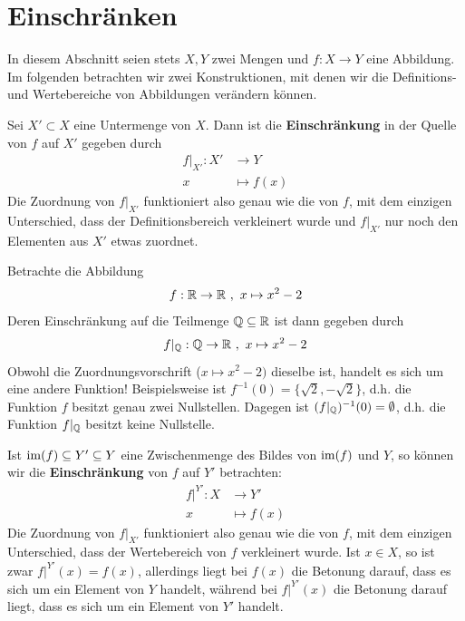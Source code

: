 \section{Einschränken}
In diesem Abschnitt seien stets $X,Y$ zwei Mengen und $f:X\to Y$ eine Abbildung. \\

Im folgenden betrachten wir zwei Konstruktionen, mit denen wir die Definitions- und Wertebereiche von Abbildungen verändern können.
\begin{de}
	Sei $X' \subset X$ eine Untermenge von $X$. Dann ist die \textbf{Einschränkung} in der Quelle von $f$ auf $X'$ gegeben durch
	\begin{align*}
		{f|}_{X'}:X' &\to Y\\
		x &\mapsto f(x)
	\end{align*}
Die Zuordnung von $f\vert_{X'}$ funktioniert also genau wie die von $f$, mit dem einzigen Unterschied, dass der Definitionsbereich verkleinert wurde und $f\vert_{X'}$ nur noch den Elementen aus $X'$ etwas zuordnet.
\end{de}



\begin{bsp}
 Betrachte die Abbildung
 \[ f : {\mathbb R} \to {\mathbb R} \ ,\ x \mapsto x^2-2 \]
 Deren Einschränkung auf die Teilmenge ${\mathbb Q}\subseteq {\mathbb R}$ ist dann gegeben durch
 \[ f\vert_{\Qz} : \Qz \to \Rz \ ,\ x\mapsto x^2-2 \]
 Obwohl die Zuordnungsvorschrift ($x\mapsto x^2-2)$ dieselbe ist, handelt es sich um eine andere Funktion! Beispielsweise ist $f^{-1}(0)= \{\sqrt{2},-\sqrt{2}\}$, d.h. die Funktion $f$ besitzt genau zwei Nullstellen. Dagegen ist $(f\vert_{{\mathbb Q}})^{-1}(0) = \emptyset$, d.h. die Funktion $f\vert_{{\mathbb Q}}$ besitzt keine Nullstelle.
\end{bsp}



\begin{de}\label{zielschrank}
	Ist $\operatorname{im}(f) \subseteq Y' \subseteq Y$ eine Zwischenmenge des Bildes von $\operatorname{im}(f)$ und $Y$, so können wir die \textbf{Einschränkung} von $f$ auf $Y'$ betrachten:
	\begin{align*}
		f|^{Y'}:X &\to Y'\\
		x &\mapsto f(x)
	\end{align*}
Die Zuordnung von $f\vert_{X'}$ funktioniert also genau wie die von $f$, mit dem einzigen Unterschied, dass der Wertebereich von $f$ verkleinert wurde. Ist $x\in X$, so ist zwar $f\vert^{Y'}(x) = f(x)$, allerdings liegt bei $f(x)$ die Betonung darauf, dass es sich um ein Element von $Y$ handelt, während bei $f\vert^{Y'}(x)$ die Betonung darauf liegt, dass es sich um ein Element von $Y'$ handelt.
\end{de}



